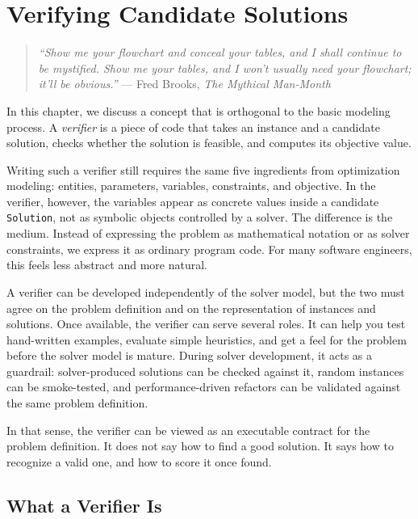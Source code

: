 \chapter{Verifying Candidate Solutions}\label{chap:4}

\begin{quote}
\emph{``Show me your flowchart and conceal your tables, and I shall
continue to be mystified. Show me your tables, and I won't usually need
your flowchart; it'll be obvious.''} --- Fred Brooks, \emph{The Mythical
Man-Month}
\end{quote}

In this chapter, we discuss a concept that is orthogonal to the basic
modeling process. A \emph{verifier} is a piece of code that takes an
instance and a candidate solution, checks whether the solution is
feasible, and computes its objective value.

Writing such a verifier still requires the same five ingredients from
optimization modeling: entities, parameters, variables, constraints, and
objective. In the verifier, however, the variables appear as concrete
values inside a candidate \lstinline!Solution!, not as
symbolic objects controlled by a solver. The difference is the medium.
Instead of expressing the problem as mathematical notation or as solver
constraints, we express it as ordinary program code. For many software
engineers, this feels less abstract and more natural.

A verifier can be developed independently of the solver model, but the
two must agree on the problem definition and on the representation of
instances and solutions. Once available, the verifier can serve several
roles. It can help you test hand-written examples, evaluate simple
heuristics, and get a feel for the problem before the solver model is
mature. During solver development, it acts as a guardrail:
solver-produced solutions can be checked against it, random instances
can be smoke-tested, and performance-driven refactors can be validated
against the same problem definition.

In that sense, the verifier can be viewed as an executable contract for
the problem definition. It does not say how to find a good solution. It
says how to recognize a valid one, and how to score it once found.

\section{What a Verifier Is}\label{sec:4.1}

